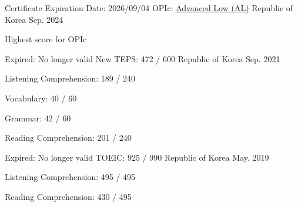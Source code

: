 

\begin{cventries}

  \cventry
    {Certificate Expiration Date: 2026/09/04} %
    {OPIc: \href{https://drive.google.com/file/d/1WA33mSp0jaU5LKnqtJ-dRN5UOLOgsfLA/view?usp=sharing}{Advanced Low (AL)}} %
    {Republic of Korea} %
    {Sep. 2024} %
    {
      \begin{cvitems} %
        \item {Highest score for OPIc}
      \end{cvitems}
    }

  \iffalse
  \cventry
    {Expired: No longer valid} %
    {New TEPS: 472 / 600} %
    {Republic of Korea} %
    {Sep. 2021} %
    {
      \begin{cvitems} %
        \item {Listening Comprehension: 189 / 240}
        \item {Vocabulary: 40 / 60}
        \item {Grammar: 42 / 60}
        \item {Reading Comprehension: 201 / 240}
      \end{cvitems}
    }

  \cventry
    {Expired: No longer valid} %
    {TOEIC: 925 / 990} %
    {Republic of Korea} %
    {May. 2019} %
    {
      \begin{cvitems} %
        \item {Listening Comprehension: 495 / 495}
        \item {Reading Comprehension: 430 / 495}
      \end{cvitems}
    }


\end{cventries}

